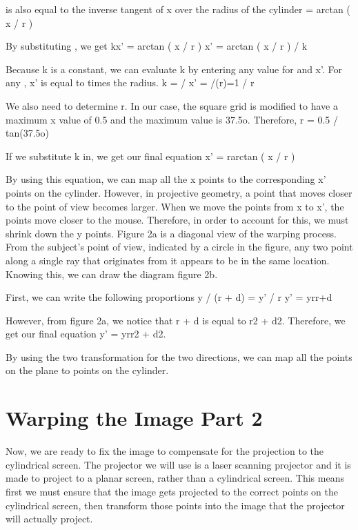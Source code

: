 \documentclass[a4paper]{article}
\begin{document}
 is also equal to the inverse tangent of x over the radius of the cylinder
 = arctan ( x / r )

By substituting , we get
kx' = arctan ( x / r )
x' = arctan ( x / r ) / k

Because k is a constant, we can evaluate k by entering any value for  and x'. For any , x' is equal to  times the radius.
k =  / x' = /(r)=1 / r

We also need to determine r. In our case, the square grid is modified to have a maximum x value of 0.5 and the maximum  value is 37.5o. Therefore, 
r = 0.5 / tan(37.5o)

If we substitute k in, we get our final equation
x' = rarctan ( x / r )

By using this equation, we can map all the x points to the corresponding x' points on the cylinder. However, in projective geometry, a point that moves closer to the point of view becomes larger. When we move the points from x to x', the points move closer to the mouse. Therefore, in order to account for this, we must shrink down the y points. 
Figure 2a is a diagonal view of the warping process. From the subject’s point of view, indicated by a circle in the figure, any two  point along a single ray that originates from it appears to be in the same location. Knowing this, we can draw the diagram figure 2b. 






First, we can write the following proportions
y / (r + d) = y' / r
y' = yrr+d

However, from figure 2a, we notice that r + d is equal to r2 + d2. Therefore, we get our final equation
y' = yrr2 + d2.

By using the two transformation for the two directions, we can map all the points on the plane to points on the cylinder.

\section{Warping the Image Part 2}

	Now, we are ready to fix the image to compensate for the projection to the cylindrical screen. The projector we will use is a laser scanning projector and it is made to project to a planar screen, rather than a cylindrical screen. This means first we must ensure that the image gets projected to the correct points on the cylindrical screen, then transform those points into the image that the projector will actually project. 
\end{document}
